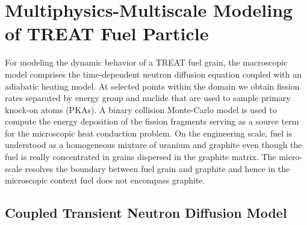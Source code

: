 \documentclass{anstrans}
\begin{document}
\section{Multiphysics-Multiscale Modeling of TREAT Fuel Particle}
For modeling the dynamic behavior of a TREAT fuel grain, the macroscopic model comprises the time-dependent neutron diffusion equation coupled with an adiabatic heating model. At selected points within the domain we obtain fission rates separated by energy group and nuclide that are used to sample primary knock-on atoms (PKAs). A binary collision Monte-Carlo model  is used to compute the energy deposition of the fission fragments serving as a source term for the microscopic heat conduction problem. On the engineering scale, fuel is understood as a homogeneous mixture of uranium and graphite even though the fuel is really concentrated in grains dispersed in the graphite matrix. The micro-scale resolves the boundary between fuel grain and graphite and hence in the microscopic context fuel does not encompass graphite.

\subsection{Coupled Transient Neutron Diffusion Model}
\end{document}
